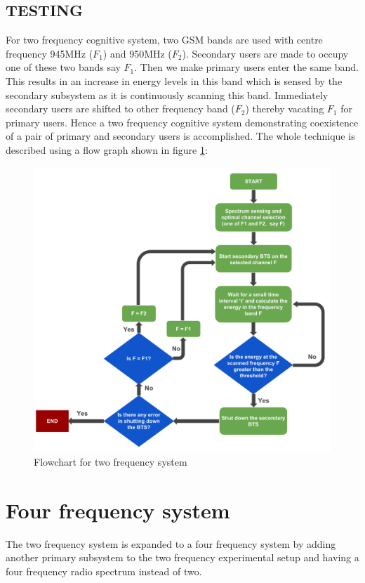 \subsection{TESTING}
For two frequency cognitive system, two GSM bands are used with centre 
frequency 945MHz ($F_1$) and 950MHz ($F_2$). Secondary users are made to occupy 
one of these two bands say $F_1$. Then we make primary users enter the same 
band. This results in an increase in energy levels in this band which is sensed 
by the secondary subsystem as it is continuously scanning this band. 
Immediately secondary users are shifted to other frequency band ($F_2$) thereby 
vacating $F_1$ for primary users. Hence a two frequency cognitive system 
demonstrating coexistence of a pair of primary and secondary users is 
accomplished. 
The whole technique is described using a flow graph shown in figure
\ref{freqSys2}:

\begin{figure}[!h]
\centering
\includegraphics[width=1\textwidth]{freqSys2}
\caption[Two frequency system]{Flowchart for two frequency system}
\label{freqSys2}
\end{figure}

\section{Four frequency system}
The two frequency system is expanded to a four frequency system by adding 
another primary subsystem to the two frequency experimental setup and having 
a four frequency radio spectrum instead of two. 


